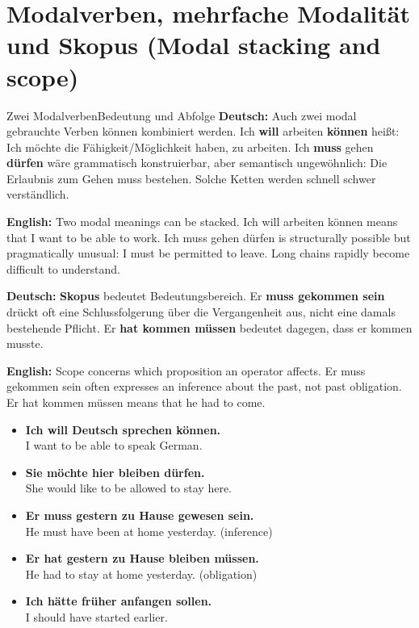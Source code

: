 \documentclass[a4paper,11pt]{article}
\newcommand{\GermanText}[1]{\textbf{Deutsch: }#1\par}
\newcommand{\EnglishText}[1]{{\small\color{SoftGray}\textbf{English: }#1\par}}
\newcommand{\ExampleItem}[2]{\item \textbf{#1}\\{\small\color{SoftGray}#2}}
\newcommand{\DEEN}[2]{\GermanText{#1}\EnglishText{#2}}
\newcommand{\Pair}[2]{\ExampleItem{#1}{#2}}
\begin{document}
\section{Modalverben, mehrfache Modalität und Skopus \textnormal{(Modal stacking and scope)}}
\begin{grammarentry}{Zwei Modalverben}{Bedeutung und Abfolge}
\DEEN{Auch zwei modal gebrauchte Verben können kombiniert werden. \glqq Ich \textbf{will} arbeiten \textbf{können}\grqq{} heißt: Ich möchte die Fähigkeit/Möglichkeit haben, zu arbeiten. \glqq Ich \textbf{muss} gehen \textbf{dürfen}\grqq{} wäre grammatisch konstruierbar, aber semantisch ungewöhnlich: Die Erlaubnis zum Gehen muss bestehen. Solche Ketten werden schnell schwer verständlich.}{Two modal meanings can be stacked. Ich will arbeiten können means that I want to be able to work. Ich muss gehen dürfen is structurally possible but pragmatically unusual: I must be permitted to leave. Long chains rapidly become difficult to understand.}
\DEEN{\textbf{Skopus} bedeutet Bedeutungsbereich. \glqq Er \textbf{muss gekommen sein}\grqq{} drückt oft eine Schlussfolgerung über die Vergangenheit aus, nicht eine damals bestehende Pflicht. \glqq Er \textbf{hat kommen müssen}\grqq{} bedeutet dagegen, dass er kommen musste.}{Scope concerns which proposition an operator affects. Er muss gekommen sein often expresses an inference about the past, not past obligation. Er hat kommen müssen means that he had to come.}
\end{grammarentry}
\begin{exbox}\begin{itemize}
\Pair{Ich will Deutsch sprechen können.}{I want to be able to speak German.}
\Pair{Sie möchte hier bleiben dürfen.}{She would like to be allowed to stay here.}
\Pair{Er muss gestern zu Hause gewesen sein.}{He must have been at home yesterday. (inference)}
\Pair{Er hat gestern zu Hause bleiben müssen.}{He had to stay at home yesterday. (obligation)}
\Pair{Ich hätte früher anfangen sollen.}{I should have started earlier.}
\end{itemize}\end{exbox}
\end{document}
